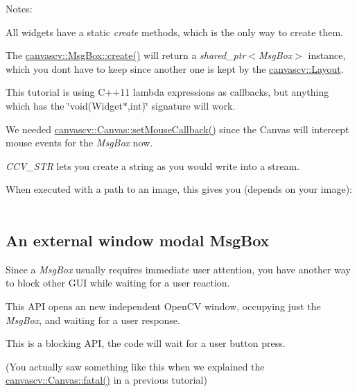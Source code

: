 Notes\+:
\begin{DoxyItemize}
\item All widgets have a static {\itshape create} methods, which is the only way to create them.
\item The \hyperlink{classcanvascv_1_1MsgBox_a3bf0019e83e367e415da29286db2c5d0}{canvascv\+::\+Msg\+Box\+::create()} will return a {\itshape shared\+\_\+ptr$<$\+Msg\+Box$>$} instance, which you don\textquotesingle{}t have to keep since another one is kept by the \hyperlink{classcanvascv_1_1Layout}{canvascv\+::\+Layout}.
\item This tutorial is using C++11 lambda expressions as callbacks, but anything which has the \char`\"{}void(\+Widget$\ast$,int)\char`\"{} signature will work.
\item We needed \hyperlink{classcanvascv_1_1Canvas_acf6e5d4b40aec610b0dc8c4f6bf93ac1}{canvascv\+::\+Canvas\+::set\+Mouse\+Callback()} since the Canvas will intercept mouse events for the {\itshape Msg\+Box} now.
\item {\itshape C\+C\+V\+\_\+\+S\+TR} lets you create a string as you would write into a stream.
\item When executed with a path to an image, this gives you (depends on your image)\+:  ~\newline

\end{DoxyItemize}\hypertarget{tutmsgbox_msgbox_s4}{}\subsection{An external window modal Msg\+Box}\label{tutmsgbox_msgbox_s4}
Since a {\itshape Msg\+Box} usually requires immediate user attention, you have another way to block other G\+UI while waiting for a user reaction.

This A\+PI opens an new independent Open\+CV window, occupying just the {\itshape Msg\+Box}, and waiting for a user response.

This is a blocking A\+PI, the code will wait for a user button press.

(You actually saw something like this when we explained the \hyperlink{classcanvascv_1_1Canvas_add93c0d5cc1e9b49f97510952a8a1961}{canvascv\+::\+Canvas\+::fatal()} in a previous tutorial)


